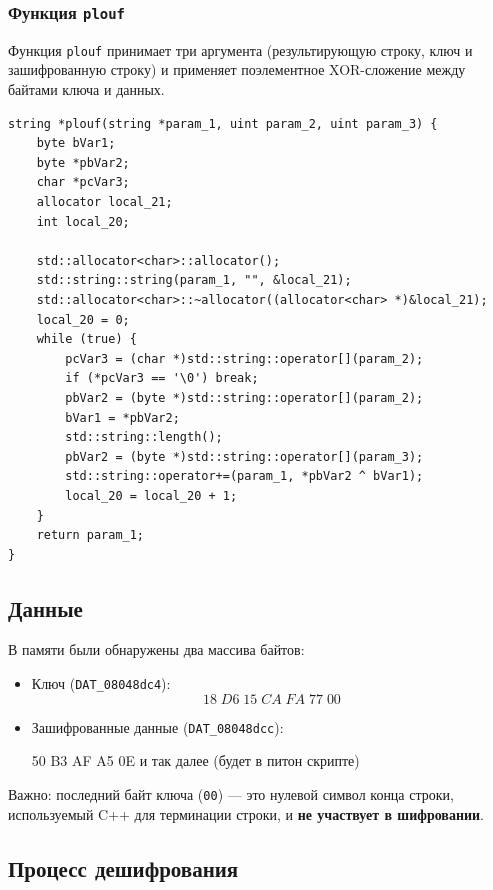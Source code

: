     \subsubsection{Функция \texttt{plouf}}

    Функция \texttt{plouf} принимает три аргумента (результирующую строку, ключ и зашифрованную строку) и применяет поэлементное XOR-сложение между байтами ключа и данных.

    \begin{verbatim}
string *plouf(string *param_1, uint param_2, uint param_3) {
    byte bVar1;
    byte *pbVar2;
    char *pcVar3;
    allocator local_21;
    int local_20;

    std::allocator<char>::allocator();
    std::string::string(param_1, "", &local_21);
    std::allocator<char>::~allocator((allocator<char> *)&local_21);
    local_20 = 0;
    while (true) {
        pcVar3 = (char *)std::string::operator[](param_2);
        if (*pcVar3 == '\0') break;
        pbVar2 = (byte *)std::string::operator[](param_2);
        bVar1 = *pbVar2;
        std::string::length();
        pbVar2 = (byte *)std::string::operator[](param_3);
        std::string::operator+=(param_1, *pbVar2 ^ bVar1);
        local_20 = local_20 + 1;
    }
    return param_1;
}
    \end{verbatim}

    \subsection{Данные}

    В памяти были обнаружены два массива байтов:

    \begin{itemize}
        \item Ключ (\texttt{DAT\_08048dc4}):
        \[
            18 \; D6 \; 15 \; CA \; FA \; 77 \; 00
        \]
        \item Зашифрованные данные (\texttt{DAT\_08048dcc}):

        50 \; B3  \; AF \; A5 \; 0E \; и так далее (будет в питон скрипте)

    \end{itemize}

    Важно: последний байт ключа (\texttt{00}) — это нулевой символ конца строки, используемый C++ для терминации строки,
    и \textbf{не участвует в шифровании}.

    \subsection{Процесс дешифрования}

